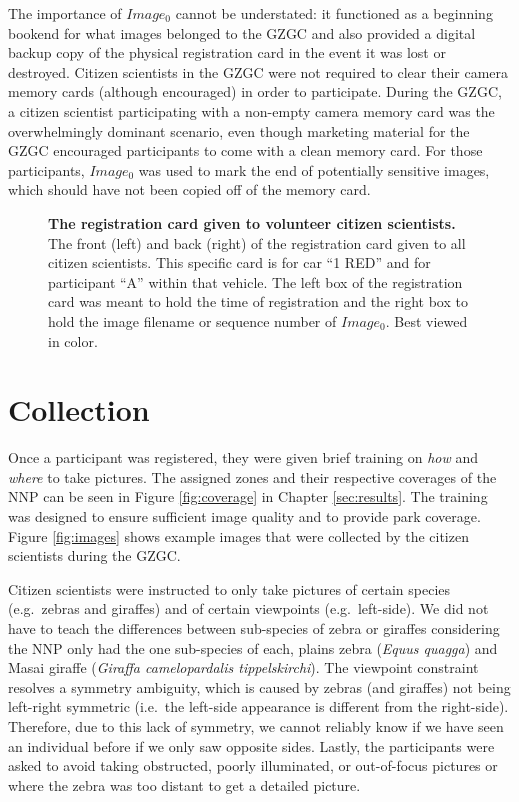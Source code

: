 The importance of $Image_0$ cannot be understated: it functioned as a beginning bookend for what images belonged to the GZGC and also provided a digital backup copy of the physical registration card in the event it was lost or destroyed.  Citizen scientists in the GZGC were not required to clear their camera memory cards (although encouraged) in order to participate.  During the GZGC, a citizen scientist participating with a non-empty camera memory card was the overwhelmingly dominant scenario, even though marketing material for the GZGC encouraged participants to come with a clean memory card.  For those participants, $Image_0$ was used to mark the end of potentially sensitive images, which should have not been copied off of the memory card.

\begin{figure}[t]%
	\centering
    	\caption[The Registration Card Given to Volunteer Citizen Scientists]{\textbf{The registration card given to volunteer citizen scientists.}  The front (left) and back (right) of the registration card given to all citizen scientists.  This specific card is for car ``1 RED'' and for participant ``A'' within that vehicle.  The left box of the registration card was meant to hold the time of registration and the right box to hold the image filename or sequence number of $Image_0$.  Best viewed in color.}
    	\label{fig:card}
\end{figure}

\section{Collection}
Once a participant was registered, they were given brief training on \textit{how} and \textit{where} to take pictures.  The assigned zones and their respective coverages of the NNP can be seen in Figure \ref{fig:coverage} in Chapter \ref{sec:results}. The training was designed to ensure sufficient image quality and to provide park coverage.  Figure \ref{fig:images} shows example images that were collected by the citizen scientists during the GZGC.

Citizen scientists were instructed to only take pictures of certain species (e.g.\ zebras and giraffes) and of certain viewpoints (e.g.\ left-side).  We did not have to teach the differences between sub-species of zebra or giraffes considering the NNP only had the one sub-species of each, plains zebra (\textit{Equus quagga}) and Masai giraffe (\textit{Giraffa camelopardalis tippelskirchi}).  The viewpoint constraint resolves a symmetry ambiguity, which is caused by zebras (and giraffes) not being left-right symmetric (i.e.\ the left-side appearance is different from the right-side).  Therefore, due to this lack of symmetry, we cannot reliably know if we have seen an individual before if we only saw opposite sides.  Lastly, the participants were asked to avoid taking obstructed, poorly illuminated, or out-of-focus pictures or where the zebra was too distant to get a detailed picture.

